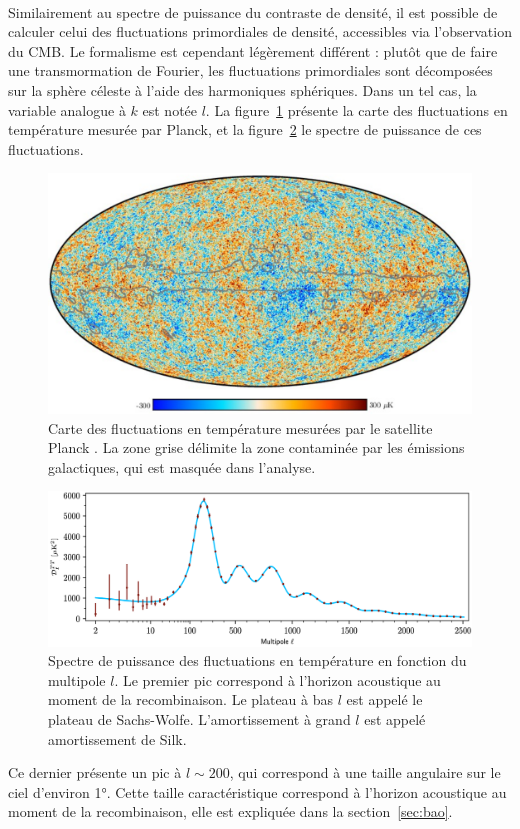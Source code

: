 \documentclass[11pt, twoside, a4paper, openright]{report}
\begin{document}
\paragraph{}
Similairement au spectre de puissance du contraste de densité, il est possible de calculer celui des fluctuations primordiales de densité, accessibles via l'observation du CMB. Le formalisme est cependant légèrement différent : plutôt que de faire une transmormation de Fourier, les fluctuations primordiales sont décomposées sur la sphère céleste à l'aide des harmoniques sphériques. Dans un tel cas, la variable analogue à $k$ est notée $l$. La figure~\ref{fig:carte_cmb} présente la carte des fluctuations en température mesurée par Planck, et la figure~\ref{fig:spectre_cmb} le spectre de puissance de ces fluctuations.
\begin{figure}
  \centering
  \includegraphics[scale=0.3]{carte_cmb}
  \caption{Carte des fluctuations en température mesurées par le satellite Planck \autocite{Aghanim2019}. La zone grise délimite la zone contaminée par les émissions galactiques, qui est masquée dans l'analyse.}
  \label{fig:carte_cmb}
\end{figure}
\begin{figure}
  \centering
  \includegraphics[scale=0.4]{spectre_cmb}
  \caption{Spectre de puissance des fluctuations en température en fonction du multipole $l$. Le premier pic correspond à l'horizon acoustique au moment de la recombinaison. Le plateau à bas $l$ est appelé le plateau de Sachs-Wolfe. L'amortissement à grand $l$ est appelé amortissement de Silk.}
  \label{fig:spectre_cmb}
\end{figure}
Ce dernier présente un pic à $l \sim 200$, qui correspond à une taille angulaire sur le ciel d'environ \ang{1}. Cette taille caractéristique correspond à l'horizon acoustique au moment de la recombinaison, elle est expliquée dans la section~\ref{sec:bao}.
\end{document}
